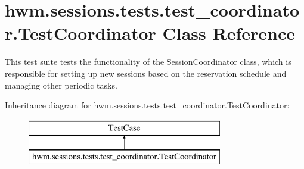 \hypertarget{classhwm_1_1sessions_1_1tests_1_1test__coordinator_1_1_test_coordinator}{\section{hwm.\-sessions.\-tests.\-test\-\_\-coordinator.\-Test\-Coordinator Class Reference}
\label{classhwm_1_1sessions_1_1tests_1_1test__coordinator_1_1_test_coordinator}
}


This test suite tests the functionality of the Session\-Coordinator class, which is responsible for setting up new sessions based on the reservation schedule and managing other periodic tasks.  


Inheritance diagram for hwm.\-sessions.\-tests.\-test\-\_\-coordinator.\-Test\-Coordinator\-:\begin{figure}[H]
\begin{center}
\leavevmode
\includegraphics[height=2.000000cm]{classhwm_1_1sessions_1_1tests_1_1test__coordinator_1_1_test_coordinator}
\end{center}
\end{figure}
